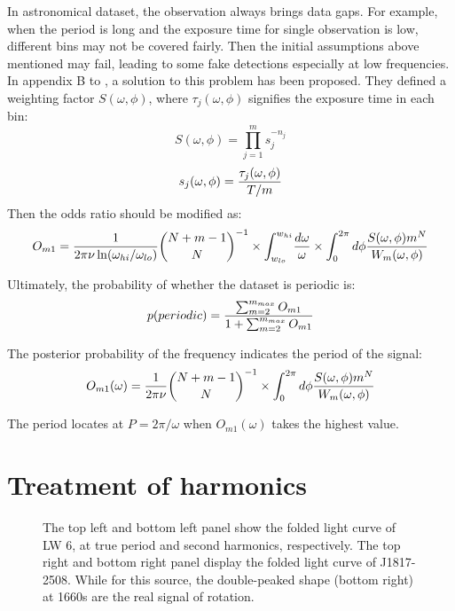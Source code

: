 \documentclass[twoside,twocolumn]{aastex63}
\begin{document}
In astronomical dataset, the observation always brings data gaps. For example, when the period is long and the exposure time for single observation is low, different bins may not be covered fairly. Then the initial assumptions above mentioned may fail, leading to some fake detections especially at low frequencies. In appendix B to \citep{1992ApJ...398..146G}, a solution to this problem has been proposed. They defined a weighting factor $S(\omega,\phi)$, where ${\tau_{j}(\omega,\phi)}$ signifies the exposure time in each bin:
\begin{equation}\label{A17}
S(\omega,\phi)={\prod_{j=1}^m s_j^{-n_j}}
\end{equation}
\begin{equation}
s_j(\omega,\phi)={{\tau_{j}(\omega,\phi)}\over {T/m}}
\end{equation}
\indent
Then the odds ratio should be modified as:
\begin{equation}\label{A19}
O_{m1}={1\over{2\pi \nu \ln(\omega_{hi}/\omega_{lo})}} {{N+m-1}	\choose N}^{-1}\times {\int_{w_{lo}}^{w_{hi}}}{{d\omega}\over{\omega}}\times {\int_0^{2\pi}d\phi{S(\omega,\phi)m^N\over W_m(\omega,\phi)}} 
\end{equation}

Ultimately, the probability of whether the dataset is periodic is:
\begin{equation}\label{A20}
p(periodic)={{\sum_{m=2}^{m_{max}} O_{m1}}\over {1+\sum_{m=2}^{m_{max}} O_{m1}}}
\end{equation}

The posterior probability of the frequency indicates the period of the signal:
\begin{equation}\label{A21}
O_{m1}(\omega)={1\over{2\pi \nu}} {{N+m-1}	\choose N}^{-1} \times {\int_0^{2\pi}d\phi{S(\omega,\phi)m^N\over W_m(\omega,\phi)}} 
\end{equation}

The period locates at $P=2\pi /\omega $ when $O_{m1}(\omega)$ takes the highest value.


\section{Treatment of harmonics}\label{harmonics}

\begin{figure}[htbp]
\caption{The top left and bottom left panel show the folded light curve of LW 6, at true period and second harmonics, respectively. The top right and bottom right panel display the folded light curve of J1817-2508. While for this source, the double-peaked shape (bottom right) at 1660s are the real signal of rotation. \label{fig:6thfig}}
\end{figure}
\end{document}
